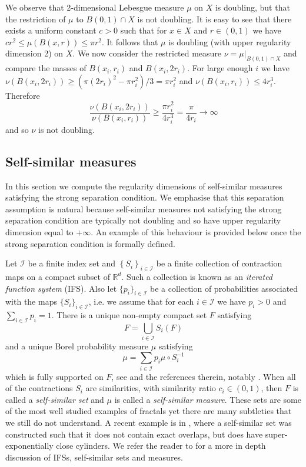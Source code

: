 We observe  that 2-dimensional Lebesgue measure $\mu$ on $X$ is doubling, but that the restriction of $\mu$ to $B(0,1) \cap X$ is not doubling.  It is easy to see that there exists a uniform constant $c>0$ such that for $x \in X$ and $r\in (0,1)$ we have $cr^2 \leq \mu(B(x,r)) \leq \pi r^2$.  It follows that $\mu$ is doubling (with upper regularity dimension 2) on $X$.  We now consider the restricted measure $\nu = \mu \vert_{B(0,1)\cap X}$ and compare the masses of $B(x_i,r_i)$ and $B(x_i,2r_i)$. For large enough $i$ we have $\nu (B(x_i,2r_i)) \ge (\pi (2r_i)^2-\pi r_i^2)/3 = \pi r_i^2$  and $\nu (B(x_i,r_i)) \le 4 r_i^3$. Therefore
\[
\frac{\nu(B(x_i,2r_i))}{\nu(B(x_i,r_i))} \ge \frac{\pi r_i^2}{4r_i^3} =  \frac{\pi}{4r_i} \to \infty
\]
and so  $\nu$ is not doubling.


\subsection{Self-similar measures}\label{ch-upper-reg:sec:self-similarresult}

In this section we compute the regularity dimensions of self-similar measures satisfying the strong separation condition. We emphasise that this separation assumption is natural because self-similar measures not satisfying the strong separation condition are typically not doubling and so have upper regularity dimension equal to $+\infty$. An example of this behaviour is provided below once the strong separation condition is formally defined. 

Let  $\mathcal{I}$ be a finite index set and $\left\{S_i \right\}_{i \in \mathcal{I}}$ be a finite collection of  contraction maps on a compact subset of $\mathbb{R}^d$.  Such a collection is known as an \textit{iterated function system} (IFS).  Also let $\{p_i\}_{i \in \mathcal{I}}$ be a collection of probabilities associated with the maps $\{S_i\}_{i \in \mathcal{I}}$, i.e. we assume that for each $i \in \mathcal{I}$ we have $p_i>0$ and $\sum_{i \in \mathcal{I}} p_i = 1$. There is a  unique non-empty compact set $F$ satisfying 
\[
F=\displaystyle\bigcup_{i\in \mathcal{I}} S_i(F)
\]
and a unique Borel probability measure $\mu$ satisfying
\[
\mu = \sum_{i \in \mathcal{I}} p_i \mu \circ S_i^{-1}
\]
which is fully supported on $F$, see \cite[Chapter 9]{falconer} and the references therein, notably \cite{hutchinson}. When all of the contractions $S_i$ are similarities, with similarity ratio $c_i \in \left(0,1 \right)$, then $F$ is called a \emph{self-similar set} and $\mu$ is called a \emph{self-similar measure}. These sets are some of the most well studied examples of fractals yet there are many subtleties that we still do not understand. A recent example is in \cite{baker}, where a self-similar set was constructed such that it does not contain exact overlaps, but does have super-exponentially close cylinders. We refer the reader to \cite{falconer} for a more in depth discussion of IFSs, self-similar sets and measures.

